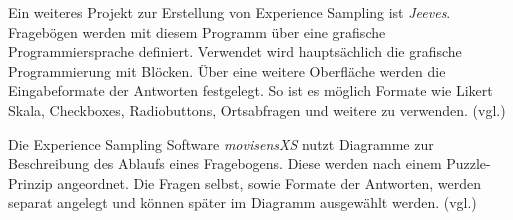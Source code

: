 Ein weiteres Projekt zur Erstellung von Experience Sampling ist \emph{Jeeves}. Fragebögen werden mit diesem Programm über eine grafische Programmiersprache definiert. Verwendet wird hauptsächlich die grafische Programmierung mit Blöcken. Über eine weitere Oberfläche werden die Eingabeformate der Antworten festgelegt. So ist es möglich Formate wie Likert Skala, Checkboxes, Radiobuttons, Ortsabfragen und weitere zu verwenden. (vgl.\cite{Rough2017})

Die Experience Sampling Software \emph{movisensXS} nutzt Diagramme zur Beschreibung des Ablaufs eines Fragebogens. Diese werden nach einem Puzzle-Prinzip angeordnet. Die Fragen selbst, sowie Formate der Antworten, werden separat angelegt und können später im Diagramm ausgewählt werden. (vgl.\cite{movisens59:online})

